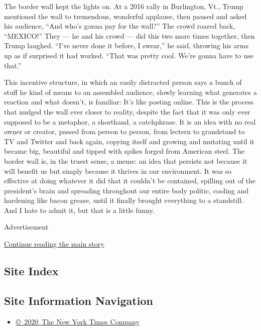 The border wall kept the lights on. At a 2016 rally in Burlington, Vt.,
Trump mentioned the wall to tremendous, wonderful applause, then paused
and asked his audience, ``And who's gonna pay for the wall?'' The crowd
roared back, ``MEXICO!'' They --- he and his crowd --- did this two more
times together, then Trump laughed. ``I've never done it before, I
swear,'' he said, throwing his arms up as if surprised it had worked.
``That was pretty cool. We're gonna have to use that.''

This incentive structure, in which an easily distracted person says a
bunch of stuff he kind of means to an assembled audience, slowly
learning what generates a reaction and what doesn't, is familiar: It's
like posting online. This is the process that nudged the wall ever
closer to reality, despite the fact that it was only ever supposed to be
a metaphor, a shorthand, a catchphrase. It is an idea with no real owner
or creator, passed from person to person, from lectern to grandstand to
TV and Twitter and back again, copying itself and growing and mutating
until it became big, beautiful and tipped with spikes forged from
American steel. The border wall is, in the truest sense, a meme: an idea
that persists not because it will benefit us but simply because it
thrives in our environment. It was so effective at doing whatever it did
that it couldn't be contained, spilling out of the president's brain and
spreading throughout our entire body politic, cooling and hardening like
bacon grease, until it finally brought everything to a standstill. And I
hate to admit it, but that is a little funny.

Advertisement

\protect\hyperlink{after-bottom}{Continue reading the main story}

\hypertarget{site-index}{%
\subsection{Site Index}\label{site-index}}

\hypertarget{site-information-navigation}{%
\subsection{Site Information
Navigation}\label{site-information-navigation}}

\begin{itemize}
\tightlist
\item
  \href{https://help.nytimes3xbfgragh.onion/hc/en-us/articles/115014792127-Copyright-notice}{©~2020~The
  New York Times Company}
\end{itemize}

